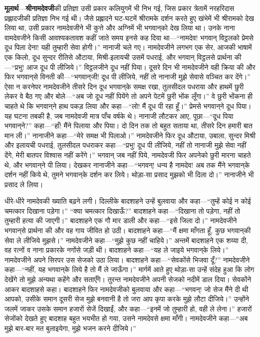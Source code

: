 \begin{sloppypar}\justifying{}
\textbf{मूलार्थ}—\textbf{श्रीनामदेवजी}की प्रतिज्ञा उसी प्रकार कलियुगमें भी निभ गई, जिस प्रकार त्रेतामें नरहरिदास प्रह्लादजीकी प्रतिज्ञा निभ गई थी। जैसे प्रह्लादने घट-घटमें श्रीरामके दर्शन करते हुए खंभेमें भी श्रीरामको देख लिया था, उसी प्रकार नामदेवजीने भी कुत्ते और अग्निमें भी भगवान्‌को देख लिया था। उनके नाना वामदेवजीने किसी आवश्यकता\-वश कहीं जाते समय इनसे कह दिया था—“नामदेव! भगवान् विट्ठलको प्रेमसे दूध पिला देना! यही तुम्हारी सेवा होगी।” नानाजी चले गए। नामदेवजीने लगभग एक सेर, आजकी भाषामें एक किलो, दूध सुन्दर रीतिसे औटाया, मिश्री-इलायची उसमें पधराई, और भगवान् विट्ठलसे प्रार्थना की—“प्रभु! आज दूध पी लीजिये।” विट्ठलजीने दूध नहीं पिया। दूसरे दिन भी नामदेवजीने वही क्रिया की और फिर भगवान्‌से विनती की—“भगवान्‌जी! दूध पी लीजिये, नहीं तो नानाजी मुझे सेवासे वञ्चित कर देंगे।” ऐसा न करनेपर नामदेवजीने तीसरे दिन दूध भगवान्‌के समक्ष रखा, तुलसीदल पधराया और हाथमें छुरी लेकर वे बैठ गए और बोले—“अब जो दूध नहीं पियेंगे तो अपने पेटमें छुरी भोंक लूँगा।” वे छुरी भोंकना ही चाहते थे कि भगवान्‌ने हाथ पकड़ लिया और कहा—“लो! मैं दूध पी रहा हूँ।” प्रेमसे भगवान्‌ने दूध पिया। यह घटना तबकी है, जब नामदेवजी मात्र पाँच वर्षके थे। नानाजी लौटकर आए, पूछा—“दूध पिया भगवान्‌ने?” कहा—“हाँ! मैंने पिलाया और पिया। दो दिन तक तो बहुत सताया था, तीसरे दिन हमारी बात मान ली।” नानाजीने कहा—“मेरे समक्ष भी पिलाओ।” नामदेवजीने फिर दूध औटाया, उबाला, सुन्दर मिश्री और इलायची पधराई, तुलसीदल पधराकर कहा—“प्रभु! दूध पी लीजिये, नहीं तो नानाजी मुझे सेवा नहीं देंगे, मेरी बातपर विश्वास नहीं करेंगे।” भगवान् जब नहीं पिये, नामदेवजी फिर अपनेको छुरी मारना चाहते थे, और भगवान्‌ने पी लिया। देखकर नानाजीने कहा—“भगवन्! धन्य है नामदेव! अब तक मैंने भगवान्‌के दर्शन नहीं किये थे, तुमने भगवान्‌के दर्शन कर लिये। थोड़ा-सा प्रसाद मुझको भी दिला दो।” नानाजीने भी प्रसाद ले लिया।
\end{sloppypar}
\begin{sloppypar}\justifying{}
धीरे-धीरे नामदेवकी ख्याति बढ़ने लगी। दिल्लीके बादशाहने उन्हें बुलवाया और कहा—“तुम्हें कोई न कोई चमत्कार दिखाना पड़ेगा।” “क्या चमत्कार दिखाऊँ?” बादशाहने कहा—“दिखाना तो पड़ेगा, नहीं तो तुम्हारी हत्या की जाएगी।” बादशाहने एक गौ मार डाली और कहा—“इसे जिला दो।” नामदेवजीने भगवान्‌से प्रार्थना की और वह गाय जीवित हो उठी। बादशाहने कहा—“मैं क्षमा माँगता हूँ, कुछ भगवान्‌की सेवा ले लीजिये मुझसे।” नामदेवजीने कहा—“मुझे कुछ नहीं चाहिये।” अन्तमें बादशाहने एक शय्या दी, वह रत्नों व नाना प्रकारके नगोंसे जड़ी थी। बादशाहने कहा—“यह ले जाइये भगवान्‌के लिये।” नामदेवजीने अपने सिरपर उस सेजको उठा लिया। बादशाहने कहा—“सेवकोंसे भिजवा दूँ?” नामदेवजीने कहा—“नहीं, यह भगवान्‌के लिये है तो मैं ले जाऊँगा।” मार्गमें आते हुए थोड़ा-सा उन्हें संदेह हुआ कि लोग देखेंगे तो मुझे अन्यथा कहेंगे और सताएँगे। तुरन्त नामदेवजीने अपनी सेजको नदीमें डाल दिया। सेवकोंने आकर बादशाहसे कहा। बादशाहने फिर नामदेवजीको बुलवाया और कहा—“भगवन्! जो सेज मैंने दी थी आपको, उसीके समान दूसरी सेज मुझे बनवानी है तो जरा आप कृपा करके मुझे लौटा दीजिये।” उन्होंने जलमें जाकर उसके समान हजारों सेजें दिखाईं, और कहा—“इनमें जो तुम्हारी हो, वही ले लेना।” हजारों सेजोंको देखते हुए बादशाह बहुत भयभीत हो गया, उसने नामदेवसे क्षमा माँगी। नामदेवजीने कहा—“अब मुझे बार-बार मत बुलाइयेगा, मुझे भजन करने दीजिये।”
\end{sloppypar}
